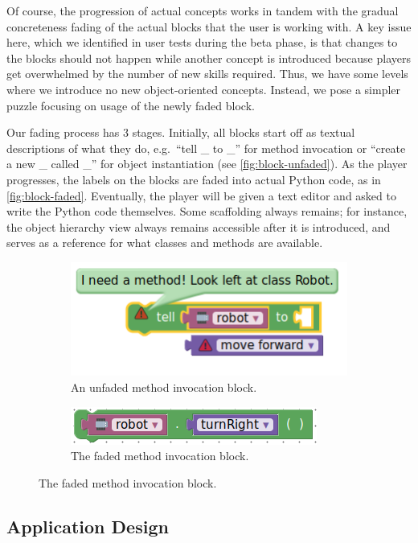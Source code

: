 \documentclass[12pt,notitlepage]{article}
\begin{document}
Of course, the progression of actual concepts works in tandem with the
gradual concreteness fading of the actual blocks that the user is
working with. A key issue here, which we identified in user tests
during the beta phase, is that changes to the blocks should not happen
while another concept is introduced because players get overwhelmed by
the number of new skills required. Thus, we have some levels where we
introduce no new object-oriented concepts. Instead, we pose a simpler
puzzle focusing on usage of the newly faded block.

Our fading process has 3 stages. Initially, all blocks start off as
textual descriptions of what they do, e.g.\ ``tell \_ to \_'' for
method invocation or ``create a new \_ called \_'' for object
instantiation (see \autoref{fig:block-unfaded}). As the player
progresses, the labels on the blocks are faded into actual Python code,
as in \autoref{fig:block-faded}. Eventually, the player will be given
a text editor and asked to write the Python code themselves. Some
scaffolding always remains; for instance, the object hierarchy view always
remains accessible after it is introduced, and serves as a reference for
what classes and methods are available.

\begin{figure}[h]
\centering
\begin{subfigure}{.5\textwidth}
  \centering
  \includegraphics[width=.5\textwidth]{block_unfaded}
  \caption{An unfaded method invocation block.}\label{fig:block-unfaded}
\end{subfigure}%
\begin{subfigure}{.5\textwidth}
  \centering
  \includegraphics[width=.5\textwidth]{block_faded}
  \caption{The faded method invocation block.}\label{fig:block-faded}
\end{subfigure}
\label{fig:test}
\end{figure}


\subsection{Application Design}
\end{document}
